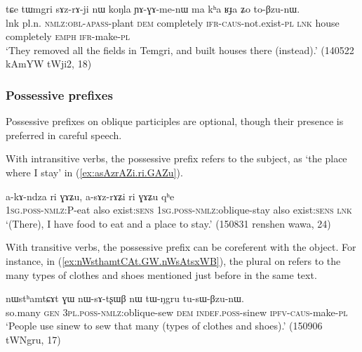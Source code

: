 \begin{exe}
\ex \label{ex:sAZrAji}
\gll  tɕe tɯmgri sɤz-rɤ-ji nɯ koŋla ɲɤ-ɣɤ-me-nɯ ma kʰa ʁɟa ʑo to-βzu-nɯ. \\
lnk pl.n. \textsc{nmlz}:\textsc{obl}-\textsc{apass}-plant \textsc{dem} completely \textsc{ifr}-\textsc{caus}-not.exist-\textsc{pl} \textsc{lnk} house completely \textsc{emph} \textsc{ifr}-make-\textsc{pl} \\
\glt `They removed all the fields in Temgri, and built houses there (instead).' (140522 kAmYW tWji2, 18)
\end{exe}

 \subsubsection{Possessive prefixes} \label{sec:oblique.participle.possessive}
Possessive prefixes on oblique participles are optional, though their presence is preferred in careful speech.

With intransitive verbs, the possessive prefix refers to the subject, as  `the place where I stay' in (\ref{ex:asAzrAZi.ri.GAZu}).

\begin{exe}
\ex \label{ex:asAzrAZi.ri.GAZu}
\gll a-kɤ-ndza ri ɣɤʑu, a-sɤz-rɤʑi ri ɣɤʑu qʰe \\
\textsc{1sg}.\textsc{poss}-\textsc{nmlz}:P-eat also exist:\textsc{sens} \textsc{1sg}.\textsc{poss}-\textsc{nmlz}:oblique-stay also exist:\textsc{sens} \textsc{lnk} \\
\glt `(There), I have food to eat and a place to stay.' (150831 renshen wawa, 24)
\end{exe}

With transitive verbs, the possessive prefix can be coreferent with the object. For instance, in (\ref{ex:nWsthamtCAt.GW.nWsAtsxWB}), the plural  on  refers to the many types of clothes and shoes mentioned just before in the same text.

 \begin{exe}
\ex \label{ex:nWsthamtCAt.GW.nWsAtsxWB}
\gll nɯstʰamtɕɤt ɣɯ nɯ-sɤ-tʂɯβ nɯ tɯ-ŋgru tu-sɯ-βzu-nɯ.   \\
so.many \textsc{gen} \textsc{3pl}.\textsc{poss}-\textsc{nmlz}:oblique-sew \textsc{dem} \textsc{indef}.\textsc{poss}-sinew \textsc{ipfv}-\textsc{caus}-make-\textsc{pl} \\
\glt `People use sinew to sew that many (types of clothes and shoes).' (150906 tWNgru, 17)
\end{exe} 


